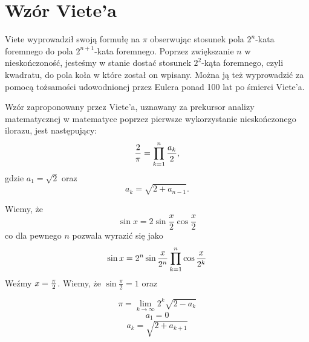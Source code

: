 \section{Wzór Viete'a}


Viete wyprowadził swoją formułę na $\pi$ obserwując stosunek pola $2^n$-kata foremnego do pola $2^{n+1}$-kata foremnego. Poprzez zwiększanie $n$ w nieskończoność, jesteśmy w stanie dostać stosunek $2^2$-kąta foremnego, czyli kwadratu, do pola koła w które został on wpisany. Można ją też wyprowadzić za pomocą tożsamości udowodnionej przez Eulera ponad 100 lat po śmierci Viete'a.

Wzór zaproponowany przez Viete'a, uznawany za prekursor analizy matematycznej w matematyce poprzez pierwsze wykorzystanie nieskończonego ilorazu, jest następujący:
\begin{equation}
    {2\over\pi}=\prod\limits_{k=1}^n{a_k\over2},
\end{equation}
gdzie $a_1=\sqrt2$ oraz
$$a_k=\sqrt{2+a_{n-1}}.$$

Wiemy, że
$$\sin{x}=2\sin{\frac x2}\cos{\frac x2}$$
co dla pewnego $n$ pozwala wyrazić się jako
$$\sin{x}=2^n\sin{{x\over 2^n}}\prod\limits_{k=1}^n\cos{x\over 2^k}$$
Weźmy $x={\pi\over 2}$. Wiemy, że $\sin{\frac\pi2}=1$ oraz




$$\pi=\lim\limits_{k\to\infty}2^k\sqrt{2-a_k}$$
$$a_1=0$$
$$a_k=\sqrt{2+a_{k+1}}$$